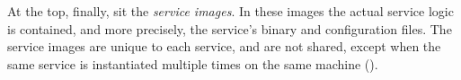 At the top, finally, sit the \emph{service images}. In these images the actual service logic is contained, and more precisely, the service's binary and configuration files. The service images are unique to each service, and are not shared, except when the same service is instantiated multiple times on the same machine ().











